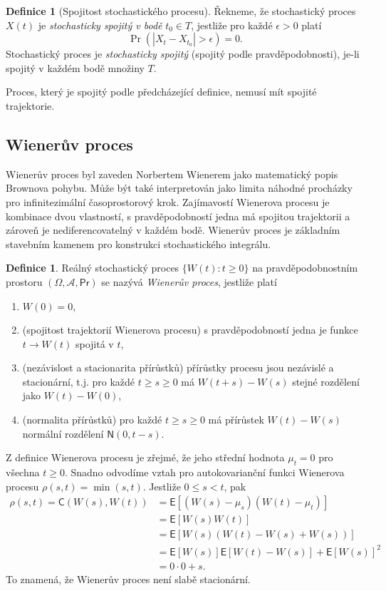 \documentclass[a4paper,12pt]{report}
\theoremstyle{definition} \newtheorem{definice}[veta]{Definice}
\theoremstyle{remark}
\begin{document}
\begin{definice}[Spojitost stochastického procesu]
Řekneme, že stochastický proces $X(t)$ je \textit{stochasticky spojitý v bodě} $t_0\in T$, jestliže pro každé $\epsilon>0$ platí
$$\Pr(|X_t-X_{t_0}|>\epsilon)=0.$$
Stochastický proces je  \textit{stochasticky spojitý} (spojitý podle pravděpodobnosti), je-li spojitý v každém bodě množiny $T$.
\end{definice}
Proces, který je spojitý podle předcházející definice, nemusí mít spojité trajektorie.


\subsection{Wienerův proces}
Wienerův proces byl zaveden Norbertem Wienerem jako matematický popis Brownova pohybu.
Může být také interpretován jako limita náhodné procházky pro infinitezimální časoprostorový krok.
Zajímavostí Wienerova procesu je kombinace dvou vlastností,
s pravděpodobností jedna má spojitou trajektorii a zároveň je nediferencovatelný v každém bodě. 
Wienerův proces je základním stavebním kamenem pro konstrukci stochastického integrálu.

\begin{definice}
Reálný stochastický proces $\{W(t):t\ge0\}$ na pravděpodobnostním prostoru $(\Omega,\mathcal{A},\mathsf{Pr})$ se nazývá \textit{Wienerův proces}, jestliže platí
\begin{enumerate}
\item[1.]$W(0)=0$, 
\item[2.](spojitost trajektorií Wienerova procesu) s pravděpodobností jedna je funkce $t\to W(t)$ spojitá v $t$,
\item[3.](nezávislost a stacionarita přírůstků) přírůstky procesu jsou nezávislé a stacionární, t.j.  pro každé $t\ge s\ge0$ má $W(t+s)-W(s)$ stejné rozdělení jako $W(t)-W(0)$,
\item[4.](normalita přírůstků) pro každé $t\ge s\ge0$ má přírůstek $W(t)-W(s)$ normální rozdělení $\mathsf{N}(0, t-s)$.
\end{enumerate}
\end{definice}

Z definice Wienerova procesu je zřejmé, že jeho střední hodnota $\mu_t=0$ pro všechna $t\ge0$.
Snadno odvodíme vztah pro autokovarianční funkci Wienerova procesu $\rho(s,t)=\min(s,t)$.
Jestliže $0\leq s<t$, pak
\begin{align*}
\rho(s,t)=\mathsf{C}(W(s),W(t))&=\mathsf{E}{\left[(W(s)-\mu_s)(W(t)-\mu_t)\right]} \\
&=\mathsf{E}{\left[W(s)W(t)\right]}  \\
&=\mathsf{E}{\left[W(s)(W(t)-W(s)+W(s))\right]} \\
&=\mathsf{E}{\left[W(s)\right]}\mathsf{E}{\left[W(t)-W(s)\right]}+\mathsf{E}{\left[W(s)\right]}^2 \\
&=0\cdot0+s.
\end{align*}
To znamená, že Wienerův proces není slabě stacionární.
\end{document}
